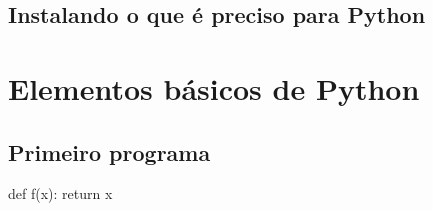 \documentclass[
	12pt,				%
	openright,			%
	twoside,			%
	a4paper,			%
	english,			%
	french,				%
	brazil,				%
	sumario=tradicional
]{abntex2}
\begin{document}
 
%


\section{Instalando o que é preciso para Python}



\chapter{Elementos básicos de Python}

\section{Primeiro programa}
\begin{python}
def f(x):
    return x
\end{python}




\postextual %


\end{document}
